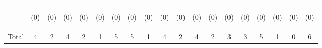 \begin{tabular}{lcccccccccccccccccc}
 & \begin{footnotesize}(0)\end{footnotesize} & \begin{footnotesize}(0)\end{footnotesize} & \begin{footnotesize}(0)\end{footnotesize} & \begin{footnotesize}(0)\end{footnotesize} & \begin{footnotesize}(0)\end{footnotesize} & \begin{footnotesize}(0)\end{footnotesize} & \begin{footnotesize}(0)\end{footnotesize} & \begin{footnotesize}(0)\end{footnotesize} & \begin{footnotesize}(0)\end{footnotesize} & \begin{footnotesize}(0)\end{footnotesize} & \begin{footnotesize}(0)\end{footnotesize} & \begin{footnotesize}(0)\end{footnotesize} & \begin{footnotesize}(0)\end{footnotesize} & \begin{footnotesize}(0)\end{footnotesize} & \begin{footnotesize}(0)\end{footnotesize} & \begin{footnotesize}(0)\end{footnotesize} & \begin{footnotesize}(0)\end{footnotesize} & \begin{footnotesize}(0)\end{footnotesize}\\
\noalign{\smallskip}Total & 4 & 2 & 4 & 2 & 1 & 5 & 5 & 1 & 4 & 2 & 4 & 2 & 3 & 3 & 5 & 1 & 0 & 6\\

\end{tabular}
